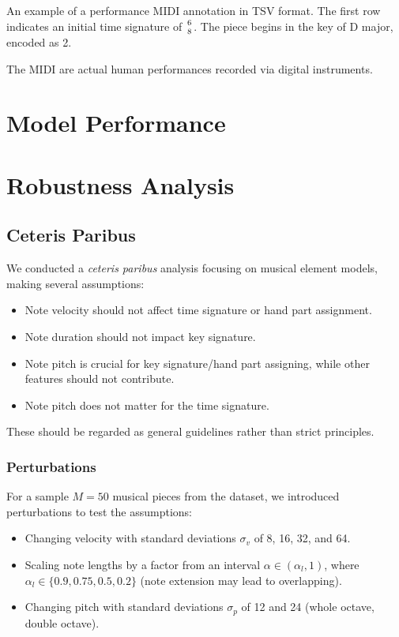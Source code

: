 \begin{table}[ht!]
\centering

\caption[Example of performance MIDI annotation in TSV format]{An example of a performance MIDI annotation in TSV format. The first row indicates an initial time signature of ${6 \atop 8}$. The piece begins in the key of D major, encoded as 2.}
\end{table}

The MIDI are actual human performances recorded via digital instruments. 

\section{Model Performance}

\missing

\section{Robustness Analysis}

\subsection{Ceteris Paribus}

We conducted a \emph{ceteris paribus} analysis focusing on musical element models, making several assumptions:

\begin{itemize}[noitemsep, topsep=4pt]
	\item Note velocity should not affect time signature or hand part assignment.
	\item Note duration should not impact key signature.
	\item Note pitch is crucial for key signature/hand part assigning, while other features should not contribute.
	\item Note pitch does not matter for the time signature.
\end{itemize}

These should be regarded as general guidelines rather than strict principles.

\subsubsection{Perturbations}

For a sample $M=50$ musical pieces from the dataset, we introduced perturbations to test the assumptions:

\begin{itemize}[noitemsep, topsep=4pt]
	\item Changing velocity with standard deviations $\sigma_v$ of 8, 16, 32, and 64.
	\item Scaling note lengths by a factor from an interval $\alpha\in(\alpha_l,1)$, where $\alpha_l\in\{0.9, 0.75, 0.5, 0.2\}$ (note extension may lead to overlapping).
	\item Changing pitch with standard deviations $\sigma_p$ of 12 and 24 (whole octave, double octave).
\end{itemize}

